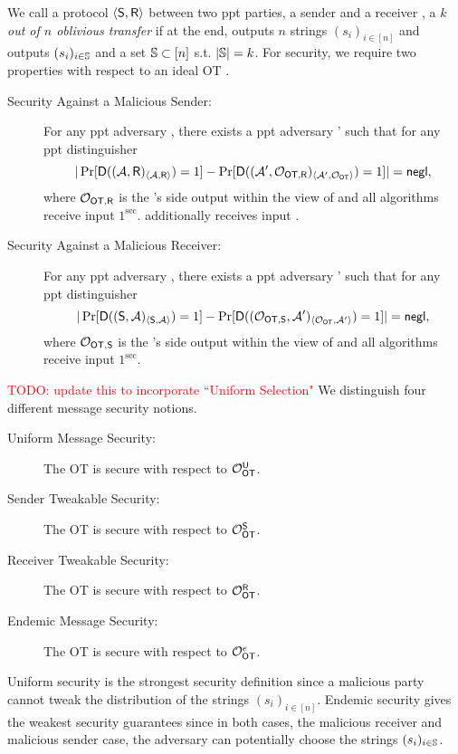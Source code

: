 \begin{definition}\label{def:otSec}
We call a protocol $\langle \mathsf{S},\mathsf{R} \rangle$ between two ppt parties, a sender \send and a receiver \rec, a \emph{$k$ out of $n$ oblivious transfer} if %
at the end, \send outputs $n$ strings $(s_i)_{i\in[n]}$ and \rec outputs $(s_i)_{i\in\mathsf{\mathbb S}}$ and a set $\mathsf{\mathbb S}\subset[n]$ s.t. $|\mathsf{\mathbb S}|=k$. For security, we require two properties with respect to an ideal OT \OOT.
\begin{description}
\item[Security Against a Malicious Sender:] For any ppt adversary \Adv, there exists a ppt adversary \Adv' such that for any ppt distinguisher \D
$$
|\Pr[\mathsf D((\mathcal{A},\mathsf{R})_{\langle \mathcal{A}, \mathsf{R}\rangle})=1] -\Pr[\mathsf D( (\mathcal{A}', \mathcal{O}_{\mathsf{OT}, \mathsf{R}})_{\langle \mathcal{A}', \mathcal{O}_{\mathsf{OT}}\rangle})=1]|=\mathsf{negl},
$$
where $\mathcal{O}_{\mathsf{OT}, \mathsf{R}}$ is the \rec's side output within the view of \OOT and all algorithms receive input $1^\sec$. \rec additionally receives input \set.
\item[Security Against a Malicious Receiver:] For any ppt adversary \Adv, there exists a ppt adversary \Adv' such that for any ppt distinguisher \D
$$
|\Pr[\mathsf D((\mathsf{S}, \mathcal{A})_{\langle \mathsf{S}, \mathcal{A}\rangle})=1] -\Pr[\mathsf D((\mathcal{O}_{\mathsf{OT},\mathsf{S}},\mathcal{A}')_{\langle \mathcal{O}_{\mathsf{OT}} , \mathcal{A}' \rangle})=1]|=\mathsf{negl},
$$
where $\mathcal{O}_{\mathsf{OT},\mathsf{S}}$ is  the \send's side output within the view of \OOT and all algorithms receive input $1^\sec$.
\end{description}


\textcolor{red}{TODO: update this to incorporate ``Uniform Selection"} We distinguish four different message security notions.
\begin{description}
\item[Uniform Message Security:] The OT is secure with respect to $\mathcal{O}_{\mathsf{OT}}^\mathsf{U}$.
\item[Sender Tweakable Security:] The OT is secure with respect to $\mathcal{O}_{\mathsf{OT}}^{\mathsf{S}}$.
\item[Receiver Tweakable Security:] The OT is secure with respect to $\mathcal{O}_{\mathsf{OT}}^{\mathsf{R}}$.
\item[Endemic Message Security:] The OT is secure with respect to $\mathcal{O}_{\mathsf{OT}}^{e}$.
\end{description}


\end{definition}

\begin{remark}
Uniform security is the strongest security definition since a malicious party cannot tweak the distribution of the strings  $(s_i)_{i\in[n]}$. Endemic security gives the weakest security guarantees since in both cases, the malicious receiver and malicious sender case, the adversary can potentially choose the strings $(s_i)_{i\in\mathsf{\mathbb S}}$.
\end{remark}

